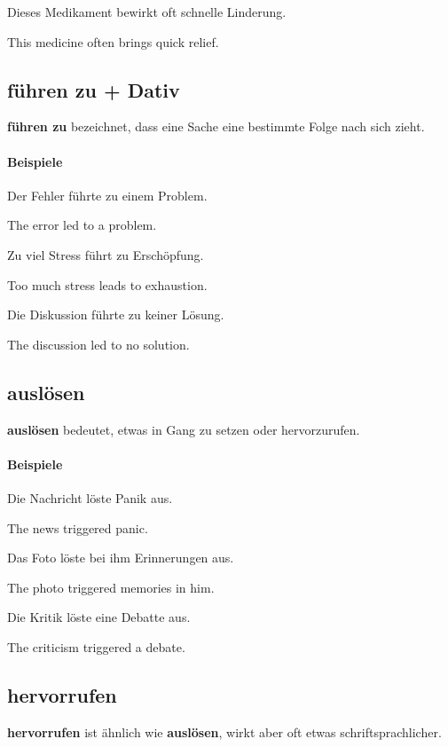 \documentclass[a4paper]{article}
\newcommand{\EN}[1]{\par{\small\textcolor{TranslationGray}{#1}}\vspace{0.25em}}
\begin{document}
        Dieses Medikament bewirkt oft schnelle Linderung.\\
        \EN{This medicine often brings quick relief.}
    
    \subsection{führen zu + Dativ}
    \textbf{führen zu} bezeichnet, dass eine Sache eine bestimmte Folge nach sich zieht.
    
    \paragraph{Beispiele}
        Der Fehler führte zu einem Problem.\\
        \EN{The error led to a problem.}
        
        Zu viel Stress führt zu Erschöpfung.\\
        \EN{Too much stress leads to exhaustion.}
        
        Die Diskussion führte zu keiner Lösung.\\
        \EN{The discussion led to no solution.}
    
    \subsection{auslösen}
    \textbf{auslösen} bedeutet, etwas in Gang zu setzen oder hervorzurufen.
    
    \paragraph{Beispiele}
        Die Nachricht löste Panik aus.\\
        \EN{The news triggered panic.}
        
        Das Foto löste bei ihm Erinnerungen aus.\\
        \EN{The photo triggered memories in him.}
        
        Die Kritik löste eine Debatte aus.\\
        \EN{The criticism triggered a debate.}
    
    \subsection{hervorrufen}
    \textbf{hervorrufen} ist ähnlich wie \textbf{auslösen}, wirkt aber oft etwas schriftsprachlicher.
    
\end{document}
